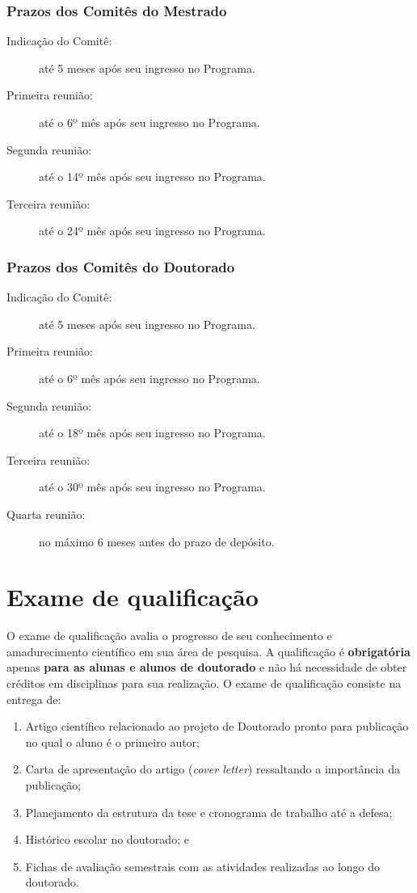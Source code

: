 \subsubsection{Prazos dos Comitês do Mestrado}
\begin{description}
\item[Indicação do Comitê:] até  5 meses após seu ingresso no Programa.
\item[Primeira reunião:] até o 6º mês após seu ingresso no Programa.
\item[Segunda reunião:] até  o 14º mês após seu ingresso no Programa.
\item[Terceira reunião:] até  o 24º mês após seu ingresso no Programa.
\end{description}

\subsubsection{Prazos dos Comitês do Doutorado}
\begin{description}
\item[Indicação do Comitê:] até 5 meses após seu ingresso no Programa.
\item[Primeira reunião:] até o 6º mês após seu ingresso no Programa.
\item[Segunda reunião:] até  o 18º mês após seu ingresso no Programa.
\item[Terceira reunião:] até  o 30º mês após seu ingresso no Programa.
\item[Quarta reunião:] no máximo 6 meses antes do prazo de depósito.
\end{description}


\section{Exame de qualificação}
\label{sec:qualif}

O exame de qualificação avalia o progresso de seu conhecimento e
amadurecimento científico em sua área de pesquisa. A qualificação é
\textbf{obrigatória} apenas \textbf{para as alunas e alunos de doutorado} e
não há necessidade de obter créditos em disciplinas para sua
realização. O exame de qualificação consiste na entrega de:
\begin{enumerate}
\item Artigo científico relacionado ao projeto de Doutorado pronto para publicação no qual o aluno é o primeiro autor;
\item Carta de apresentação do artigo (\emph{cover letter}) ressaltando a importância da publicação; 
\item Planejamento da estrutura da tese e cronograma de trabalho até a defesa;
\item Histórico escolar no doutorado; e 
\item Fichas de avaliação semestrais com as atividades realizadas ao longo do doutorado.
\end{enumerate}

